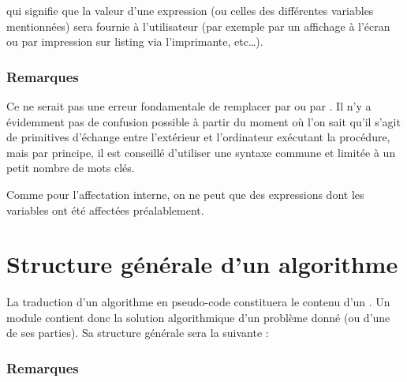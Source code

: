 		qui signifie que la valeur d’une expression (ou celles des différentes
		variables mentionnées) sera fournie à l’utilisateur (par exemple par un
		affichage à l’écran ou par impression sur listing via l’imprimante,
		etc\dots).

		\subsubsection*{Remarques}

		\begin{liste}
		\item
			Ce ne serait pas une erreur fondamentale de remplacer
			 par  ou
			 par . Il n’y a
			évidemment pas de confusion possible à partir du moment où l’on sait
			qu’il s’agit de primitives d’échange entre l’extérieur et l’ordinateur
			exécutant la procédure, mais par principe, il est conseillé d’utiliser
			une syntaxe commune et limitée à un petit nombre de mots clés.
		\item
			Comme pour l’affectation interne, on ne peut 
			que des expressions dont les variables ont été affectées préalablement.
		\end{liste}

	\section{Structure générale d’un algorithme}

		La traduction d’un algorithme en pseudo-code constituera le contenu d’un
		. Un module contient donc la solution
		algorithmique d’un problème donné (ou d’une de ses parties). Sa
		structure générale sera la suivante :


		\subsubsection*{Remarques}
		
